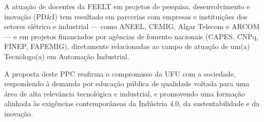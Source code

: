 A atuação de docentes da FEELT em projetos de pesquisa, desenvolvimento e inovação (PD\&I) tem resultado em parcerias com empresas e instituições dos setores elétrico e industrial — como ANEEL, CEMIG, Algar Telecom e ARCOM — e em projetos financiados por agências de fomento nacionais (CAPES, CNPq, FINEP, FAPEMIG), diretamente relacionadas ao campo de atuação de um(a) Tecnólogo(a) em Automação Industrial. %

A proposta deste PPC reafirma o compromisso da UFU com a sociedade, respondendo à demanda por educação pública de qualidade voltada para uma área de alta relevância tecnológica e industrial, e promovendo uma formação alinhada às exigências contemporâneas da Indústria 4.0, da sustentabilidade e da inovação.
